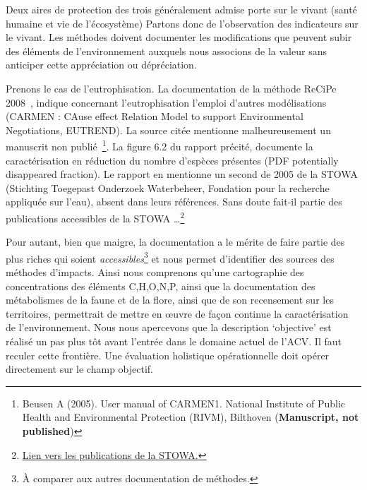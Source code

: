 Deux aires de protection des trois généralement admise porte sur le vivant (santé humaine et vie de l'écosystème)
Partons donc de l'observation des indicateurs sur le vivant.
Les méthodes doivent documenter les modifications que peuvent subir des éléments de l'environnement auxquels nous associons de la valeur sans anticiper cette appréciation ou dépréciation.

Prenons le cas de l'eutrophisation.
La documentation de la méthode ReCiPe 2008~\cite{goedkoop_recipe_2013}, indique concernant l'eutrophisation l'emploi d'autres modélisations (CARMEN :  CAuse effect Relation Model to support Environmental Negotiations, EUTREND).
La source citée mentionne malheureusement un manuscrit non publié~\footnote{Beusen A (2005). User manual of CARMEN1. National Institute of Public Health and Environmental Protection (RIVM), Bilthoven (\textbf{Manuscript, not published})}.
La figure 6.2 du rapport précité, documente la caractérisation en réduction du nombre d'espèces présentes (PDF potentially disappeared fraction).
Le rapport en mentionne un second de 2005 de la STOWA (Stichting Toegepast Onderzoek Waterbeheer, Fondation pour la recherche appliquée sur l'eau), absent dans leurs références.
Sans doute fait-il partie des publications accessibles de la STOWA \ldots \footnote{\href{http://www.stowa.nl/publicaties/publicaties/}{Lien vers les publications de la STOWA.}}

Pour autant, bien que maigre, la documentation a le mérite de faire partie des plus riches qui soient \emph{accessibles}\footnote{À comparer aux autres documentation de méthodes.} et nous permet d'identifier des sources des méthodes d'impacts.
Ainsi nous comprenons qu'une cartographie des concentrations des éléments C,H,O,N,P, ainsi que la documentation des métabolismes de la faune et de la flore, ainsi que de son recensement sur les territoires, permettrait de mettre en œuvre de façon continue la caractérisation de l'environnement.
Nous nous apercevons que la description `objective' est réalisé un pas plus tôt avant l'entrée dans le domaine actuel de l'ACV.
Il faut reculer cette frontière.
Une évaluation holistique opérationnelle doit opérer directement sur le champ objectif.

